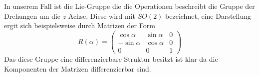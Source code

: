 \begin{beispiel}[$SO(n)$]

\end{beispiel}
In unserem Fall ist die Lie-Gruppe die die Operationen beschreibt die Gruppe der
Drehungen um die $z$-Achse. Diese wird mit $SO(2)$ bezeichnet, eine Darstellung
ergit sich beispielsweise durch Matrizen der Form
\begin{equation}
R(\alpha)=
\begin{pmatrix}
\cos\alpha&\sin\alpha&0\\
-\sin\alpha&\cos\alpha&0\\
0&0&1
\end{pmatrix}
\end{equation}
Das diese Gruppe eine differenzierbare Struktur besitzt ist klar da die
Komponenten der Matrizen differenzierbar sind.
\begin{definition}

\end{definition}

